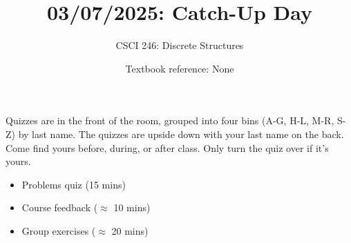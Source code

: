 \documentclass[10pt]{beamer}
\begin{document}






\title{03/07/2025: Catch-Up Day}
\author{CSCI 246: Discrete Structures}
\date{Textbook reference: None}

\begin{frame}
    \titlepage 
\end{frame}


\begin{frame}
\footnotesize 
\begin{mygreenbox}[title=Graded Quiz Pickup]
Quizzes are in the front of the room, grouped into four bins (A-G, H-L, M-R, S-Z) by last name. The quizzes are upside down with your last name on the back. Come find yours before, during, or after class.  Only turn the quiz over if it's yours.
\end{mygreenbox} 
\vfill 


\vfill 


\begin{myyellowbox}[title=Today's Agenda]
\begin{itemize}
	\item Problems quiz (15 mins)
	\item Course feedback ($\approx$ 10 mins)
	\item Group exercises ($\approx$ 20 mins)
\end{itemize}

%	
\end{myyellowbox}
\vfill 

\end{frame}
\end{document}
